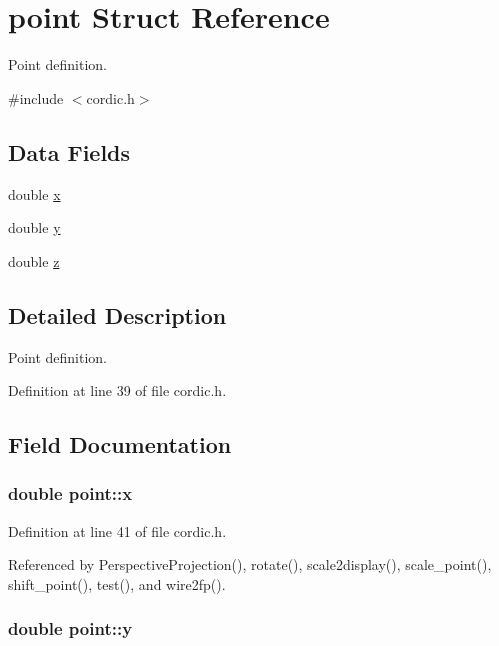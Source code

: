 \hypertarget{structpoint}{\section{point Struct Reference}
\label{structpoint}
}


Point definition.  




{\ttfamily \#include $<$cordic.\-h$>$}

\subsection*{Data Fields}
\begin{DoxyCompactItemize}
\item 
double \hyperlink{structpoint_a9c6b34deaf4900ad4193c17935fd384a}{x}
\item 
double \hyperlink{structpoint_a613f8f0d7352731638b0094e1b958b87}{y}
\item 
double \hyperlink{structpoint_aab1f0c3682401083b5bf252e7001874f}{z}
\end{DoxyCompactItemize}


\subsection{Detailed Description}
Point definition. 

Definition at line 39 of file cordic.\-h.



\subsection{Field Documentation}
\hypertarget{structpoint_a9c6b34deaf4900ad4193c17935fd384a}{
\subsubsection[{x}]{\setlength{\rightskip}{0pt plus 5cm}double point\-::x}}\label{structpoint_a9c6b34deaf4900ad4193c17935fd384a}


Definition at line 41 of file cordic.\-h.



Referenced by Perspective\-Projection(), rotate(), scale2display(), scale\-\_\-point(), shift\-\_\-point(), test(), and wire2fp().

\hypertarget{structpoint_a613f8f0d7352731638b0094e1b958b87}{
\subsubsection[{y}]{\setlength{\rightskip}{0pt plus 5cm}double point\-::y}}\label{structpoint_a613f8f0d7352731638b0094e1b958b87}


